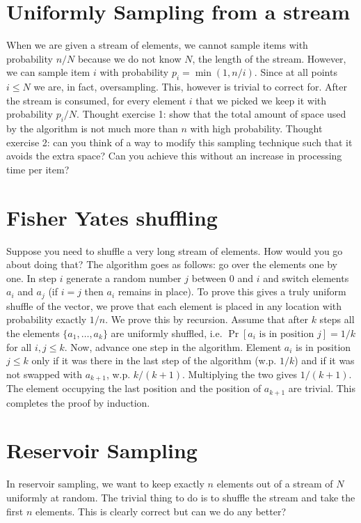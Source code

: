 \section{Uniformly Sampling from a stream}
When we are given a stream of elements, we cannot sample items with probability $n/N$ because we do not know $N$, the length of the stream.
However, we can sample item $i$ with probability $p_i = \min(1,n/i)$. Since at all points $i \le N$ we are, in fact, oversampling. 
This, however is trivial to correct for. After the stream is consumed, for every element $i$ that we picked we keep it with probability $p_i/N$.
Thought exercise 1: show that the total amount of space used by the algorithm is not much more than $n$ with high probability.
Thought exercise 2: can you think of a way to modify this sampling technique such that it avoids the extra space? Can you achieve this without an increase in processing time per item?

\section{Fisher Yates shuffling}
Suppose you need to shuffle a very long stream of elements. How would you go about doing that?
The algorithm goes as follows: go over the elements one by one.
In step $i$ generate a random number $j$ between $0$ and $i$ and switch
elements $a_i$ and $a_j$ (if $i=j$ then $a_i$ remains in place).
To prove this gives a truly uniform shuffle of the vector, we prove that each element 
is placed in any location with probability exactly $1/n$.
We prove this by recursion. Assume that after $k$ steps all the elements $\{a_1,\ldots,a_k\}$ 
are uniformly shuffled, i.e. $\Pr[a_i \mbox{ is in position } j] = 1/k$ for all $i,j \le k$. 
Now, advance one step in the algorithm.
Element $a_i$ is in position $j \le k$ only if it was there in the last step of the algorithm (w.p. $1/k$) and if
it was not swapped with $a_{k+1}$, w.p. $k/(k+1)$. Multiplying the two gives $1/(k+1)$.
The element occupying the last position and the position of $a_{k+1}$ are trivial. 
This completes the proof by induction.

\section{Reservoir Sampling}
In reservoir sampling, we want to keep exactly $n$ elements out of a stream of $N$ uniformly at random.
The trivial thing to do is to shuffle the stream and take the first $n$ elements. 
This is clearly correct but can we do any better?


